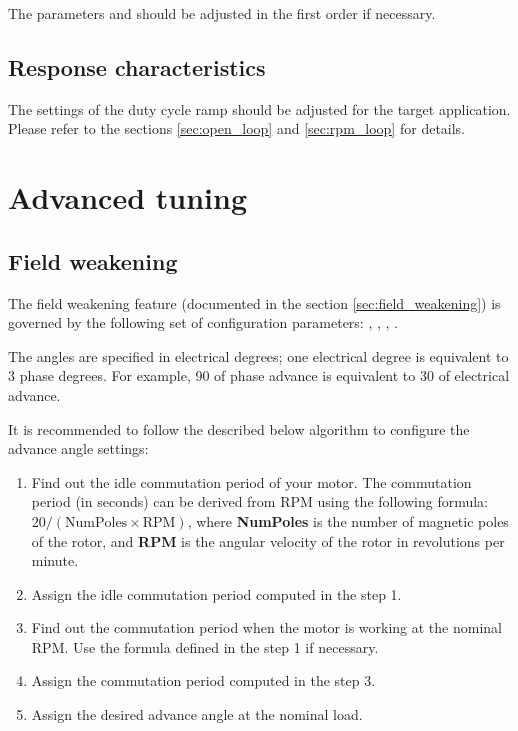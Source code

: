 \documentclass{zubaxdoc}
\begin{document}
The parameters  and  should be adjusted in the first
order if necessary.

\subsection{Response characteristics}

The settings of the duty cycle ramp should be adjusted for the target application.
Please refer to the sections \ref{sec:open_loop} and \ref{sec:rpm_loop} for details.

\section{Advanced tuning}

\subsection{Field weakening}

The field weakening feature (documented in the section \ref{sec:field_weakening}) is governed by the following
set of configuration parameters:
, , , .

The angles are specified in electrical degrees;
one electrical degree is equivalent to 3 phase degrees.
For example, 90\textdegree{} of phase advance is equivalent to 30\textdegree{} of electrical advance.

It is recommended to follow the described below algorithm to configure the advance angle settings:

\begin{enumerate}
    \item Find out the idle commutation period of your motor.
          The commutation period (in seconds) can be derived from RPM using the following formula:
          $20 / (\text{NumPoles}\times\text{RPM})$, where \textbf{NumPoles} is the number of magnetic poles
          of the rotor, and \textbf{RPM} is the angular velocity of the rotor in revolutions per minute.

    \item Assign  the idle commutation period computed in the step 1.

    \item Find out the commutation period when the motor is working at the nominal RPM.
          Use the formula defined in the step 1 if necessary.

    \item Assign  the commutation period computed in the step 3.

    \item Assign  the desired advance angle at the nominal load.
\end{enumerate}
\end{document}
